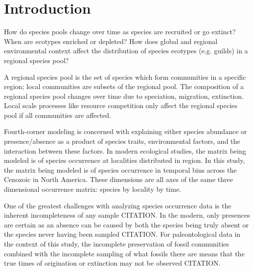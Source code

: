 \documentclass[12pt,letterpaper]{article}
\begin{document}
\section*{Introduction}


How do species pools change over time as species are recruited or go extinct? When are ecotypes enriched or depleted? How does global and regional environmental context affect the distribution of species ecotypes (e.g. guilds) in a regional species pool?

A regional species pool is the set of species which form communities in a specific region; local communities are subsets of the regional pool. The composition of a regional species pool changes over time due to speciation, migration, extinction. Local scale processes like resource competition only affect the regional species pool if all communities are affected.

Fourth-corner modeling is concerned with explaining either species abundance or presence/absence as a product of species traits, environmental factors, and the interaction between these factors. In modern ecological studies, the matrix being modeled is of species occurrence at localities distributed in region. In this study, the matrix being modeled is of species occurrence in temporal bins across the Cenozoic in North America. These dimensions are all axes of the same three dimensional occurrence matrix: species by locality by time.

 One of the greatest challenges with analyzing species occurrence data is the inherent incompleteness of any sample CITATION. In the modern, only presences are certain as an absence can be caused by both the species being truly absent or the species never having been sampled CITATION. For paleontological data in the context of this study, the incomplete preservation of fossil communities combined with the incomplete sampling of what fossils there are means that the true times of origination or extinction may not be observed CITATION.
\end{document}
